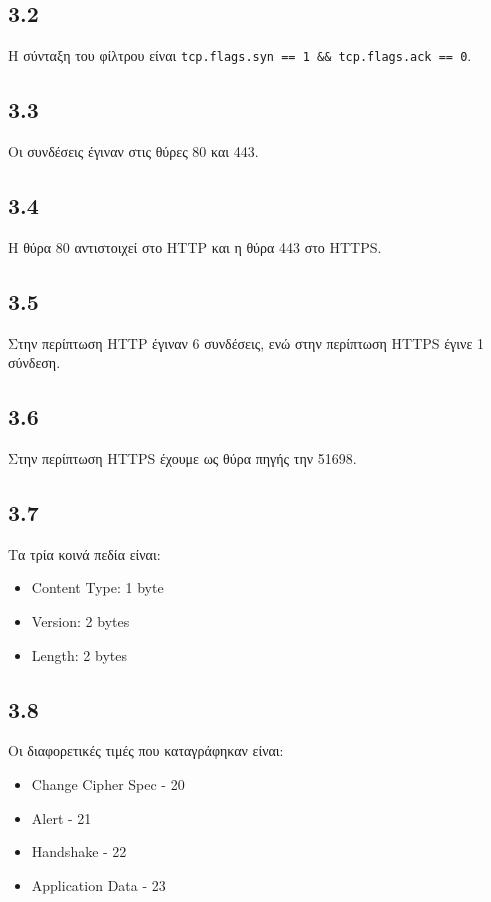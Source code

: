 		\subsection*{3.2}
			Η σύνταξη του φίλτρου είναι \verb|tcp.flags.syn == 1 && tcp.flags.ack == 0|.

		\subsection*{3.3}
			Οι συνδέσεις έγιναν στις θύρες 80 και 443.

		\subsection*{3.4}
			Η θύρα 80 αντιστοιχεί στο HTTP και η θύρα 443 στο HTTPS.

		\subsection*{3.5}
			Στην περίπτωση HTTP έγιναν 6 συνδέσεις, ενώ στην περίπτωση HTTPS έγινε 1 σύνδεση.

		\subsection*{3.6}
			Στην περίπτωση HTTPS έχουμε ως θύρα πηγής την 51698.

		\subsection*{3.7}
			Τα τρία κοινά πεδία είναι: 
			
			\begin{itemize}
				\item Content Type: 1 byte
				\item Version: 2 bytes
				\item Length: 2 bytes
			\end{itemize}

		\subsection*{3.8}
			Οι διαφορετικές τιμές που καταγράφηκαν είναι:
		
			\begin{itemize}
				\item Change Cipher Spec - 20
				\item Alert - 21
				\item Handshake - 22
				\item Application Data - 23
			\end{itemize}

